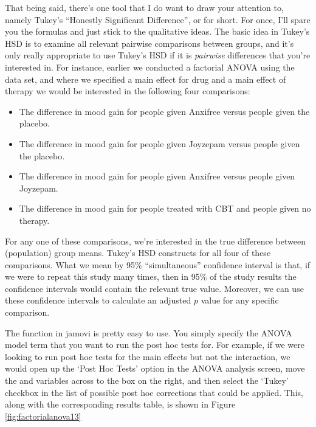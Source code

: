That being said, there's one tool that I do want to draw your attention to, namely Tukey's ``Honestly Significant Difference'', or  for short. For once, I'll spare you the formulas and just stick to the qualitative ideas. The basic idea in Tukey's HSD is to examine all relevant pairwise comparisons between groups, and it's only really appropriate to use Tukey's HSD if it is {\it pairwise} differences that you're interested in. For instance, earlier we conducted a factorial ANOVA using the  data set, and where we specified a main effect for drug and a main effect of therapy we would be interested in the following four comparisons:
\begin{itemize}
\item The difference in mood gain for people given Anxifree versus people given the placebo.
\item The difference in mood gain for people given Joyzepam versus people given the placebo.
\item The difference in mood gain for people given Anxifree versus people given Joyzepam.
\item The difference in mood gain for people treated with CBT and people given no therapy.
\end{itemize}
For any one of these comparisons, we're interested in the true difference between (population) group means. Tukey's HSD constructs  for all four of these comparisons. What we mean by 95\% ``simultaneous'' confidence interval is that, if we were to repeat this study many times, then in 95\% of the study results the confidence intervals would contain the relevant true value. Moreover, we can use these confidence intervals to calculate an adjusted $p$ value for any specific comparison. 

The  function in jamovi is pretty easy to use. You simply specify the ANOVA model term that you want to run the post hoc tests for. For example, if we were looking to run post hoc tests for the main effects but not the interaction, we would open up the `Post Hoc Tests' option in the ANOVA analysis screen, move the  and  variables across to the box on the right, and then select the `Tukey' checkbox in the list of possible post hoc corrections that could be applied.  This, along with the corresponding results table, is shown in Figure \ref{fig:factorialanova13}  

